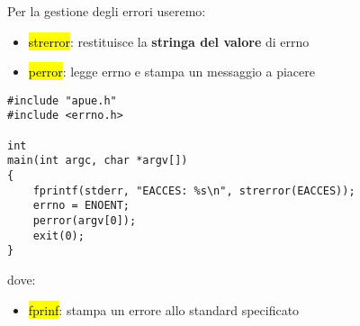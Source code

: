 Per la gestione degli errori useremo:

\begin{itemize}
	\item \hl{strerror}: restituisce la \textbf{stringa del valore} di errno
	\item \hl{perror}: legge errno e stampa un messaggio a piacere
\end{itemize}


\begin{lstlisting}
#include "apue.h"
#include <errno.h>

int
main(int argc, char *argv[])
{
	fprintf(stderr, "EACCES: %s\n", strerror(EACCES));
	errno = ENOENT;
	perror(argv[0]);
	exit(0);
}
\end{lstlisting}


dove:

\begin{itemize}
	\item \hl{fprinf}: stampa un errore allo standard specificato
\end{itemize}



